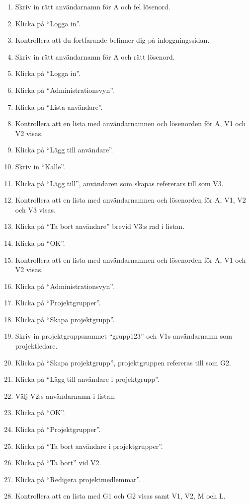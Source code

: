 \documentclass[a4paper]{article}
\begin{document}
\begin{ST}
\begin{enumerate}
\item Skriv in rätt användarnamn för A och fel lösenord.
\item Klicka på ``Logga in''.
\item Kontrollera att du fortfarande befinner dig på inloggningssidan.
\item Skriv in rätt användarnamn för A och rätt lösenord.
\item Klicka på ``Logga in''.
\item Klicka på ``Administrationsvyn''.
\item Klicka på ``Lista användare''.
\item Kontrollera att en lista med användarnamnen och lösenorden för A, V1 och V2 visas.
\item Klicka på ``Lägg till användare''.
\item Skriv in ``Kalle''.
\item Klicka på ``Lägg till'', användaren som skapas refererars till som V3.
\item Kontrollera att en lista med användarnamnen och lösenorden för A, V1, V2 och V3 visas.
\item Klicka på ``Ta bort användare'' brevid V3:s rad i listan.
\item Klicka på ``OK''.
\item Kontrollera att en lista med användarnamnen och lösenorden för A, V1 och V2 visas.
\item Klicka på ``Administrationsvyn''.
\item Klicka på ``Projektgrupper''.
\item Klicka på ``Skapa projektgrupp''.
\item Skriv in projektgruppsnamnet ``grupp123'' och V1s användarnamn som projektledare.
\item Klicka på ``Skapa projektgrupp'', projektgruppen refereras till som G2.
\item Klicka på ``Lägg till användare i projektgrupp''.
\item Välj V2:s användarnamn i listan.
\item Klicka på ``OK''.
\item Klicka på ``Projektgrupper''. %
\item Klicka på ``Ta bort användare i projektgrupper''.
\item Klicka på ``Ta bort'' vid V2.
\item Klicka på ``Redigera projektmedlemmar''.
\item Kontrollera att en lista med G1 och G2 visas samt V1, V2, M och L.

\end{enumerate}
\end{ST}
\end{document}
